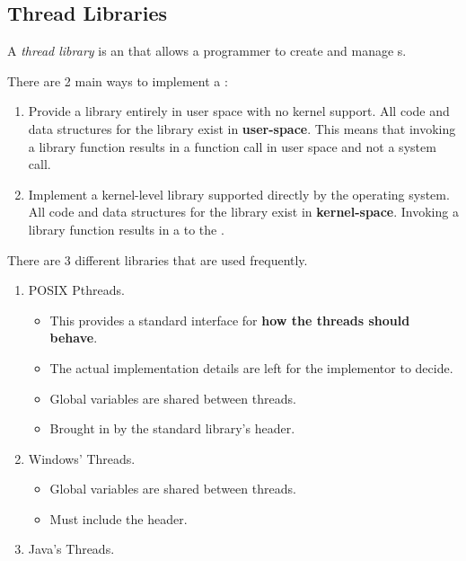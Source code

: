 \subsection{Thread Libraries}\label{subsec:Thread_Libraries}
\begin{definition}\label{def:Thread_Library}
  A \emph{thread library} is an  that allows a programmer to create and manage s.
\end{definition}

There are 2 main ways to implement a :
\begin{enumerate}[noitemsep]
\item Provide a library entirely in user space with no kernel support.
  All code and data structures for the library exist in \textbf{user-space}.
  This means that invoking a library function results in a function call in user space and not a system call.
\item Implement a kernel-level library supported directly by the operating system.
  All code and data structures for the library exist in \textbf{kernel-space}.
  Invoking a library function results in a  to the .
\end{enumerate}

There are 3 different libraries that are used frequently.
\begin{enumerate}[noitemsep]
\item POSIX Pthreads.
  \begin{itemize}[noitemsep]
  \item This provides a standard interface for \textbf{how the threads should behave}.
  \item The actual implementation details are left for the implementor to decide.
  \item Global variables are shared between threads.
  \item Brought in by the standard library's  header.
  \end{itemize}
\item Windows' Threads.
  \begin{itemize}[noitemsep]
  \item Global variables are shared between threads.
  \item Must include the  header.
  \end{itemize}
\item Java's Threads.
\end{enumerate}

